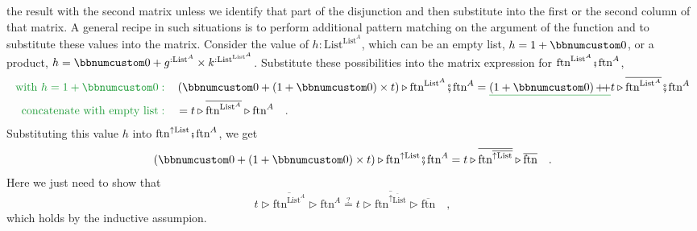 the result with the second matrix unless we identify that part of
the disjunction and then substitute into the first or the second column
of that matrix. A general recipe in such situations is to perform
additional pattern matching on the argument of the function and to
substitute these values into the matrix. Consider the value of $h:\text{List}^{\text{List}^{A}}$,
which can be an empty list, $h=1+\bbnum 0$, or a product, $h=\bbnum 0+g^{:\text{List}^{A}}\times k^{:\text{List}^{\text{List}^{A}}}$.
Substitute these possibilities into the matrix expression for $\text{ftn}^{\text{List}^{A}}\bef\text{ftn}^{A}$,
\begin{align*}
{\color{greenunder}\text{with }h=1+\bbnum 0:}\quad & \left(\bbnum 0+\left(1+\bbnum 0\right)\times t\right)\triangleright\text{ftn}^{\text{List}^{A}}\bef\text{ftn}^{A}=\gunderline{\left(1+\bbnum 0\right)\pplus}t\triangleright\overline{\text{ftn}^{\text{List}^{A}}}\bef\text{ftn}^{A}\\
{\color{greenunder}\text{concatenate with empty list}:}\quad & =t\triangleright\overline{\text{ftn}^{\text{List}^{A}}}\triangleright\text{ftn}^{A}\quad.
\end{align*}
Substituting this value $h$ into $\text{ftn}^{\uparrow\text{List}}\bef\text{ftn}^{A}$,
we get 
\[
\left(\bbnum 0+\left(1+\bbnum 0\right)\times t\right)\triangleright\text{ftn}^{\uparrow\text{List}}\bef\text{ftn}^{A}=t\triangleright\overline{\text{ftn}^{\overline{\uparrow\text{List}}}}\triangleright\overline{\text{ftn}}\quad.
\]
Here we just need to show that
\[
t\triangleright\overline{\text{ftn}^{\text{List}^{A}}}\triangleright\text{ftn}^{A}\overset{?}{=}t\triangleright\overline{\text{ftn}^{\overline{\uparrow\text{List}}}}\triangleright\overline{\text{ftn}}\quad,
\]
which holds by the inductive assumpion.

